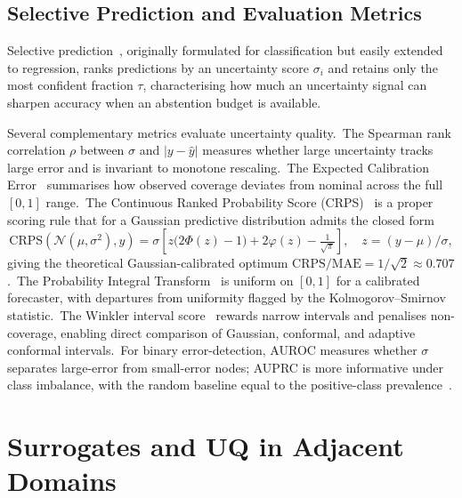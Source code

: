 \subsection{Selective Prediction and Evaluation Metrics}\label{sec:uq_metrics_bg}

Selective prediction~\cite{geifman2017selective}, originally formulated for classification but easily extended to regression, ranks predictions by an uncertainty score $\sigma_i$ and retains only the most confident fraction $\tau$, characterising how much an uncertainty signal can sharpen accuracy when an abstention budget is available.

Several complementary metrics evaluate uncertainty quality.\ The Spearman rank correlation $\rho$ between $\sigma$ and $|y - \hat y|$ measures whether large uncertainty tracks large error and is invariant to monotone rescaling.\ The Expected Calibration Error~\cite{kuleshov2018accurate,guo2017calibration} summarises how observed coverage deviates from nominal across the full $[0,1]$ range.\ The Continuous Ranked Probability Score (CRPS)~\cite{gneiting2007strictly} is a proper scoring rule that for a Gaussian predictive distribution admits the closed form
\begin{equation}\label{eq:crps_gaussian_bg}
 \mathrm{CRPS}\!\left(\mathcal{N}(\mu,\sigma^2), y\right)
 = \sigma\!\left[z\bigl(2\Phi(z) - 1\bigr) + 2\varphi(z) - \tfrac{1}{\sqrt{\pi}}\right],
 \quad z = (y - \mu)/\sigma,
\end{equation}
giving the theoretical Gaussian-calibrated optimum $\mathrm{CRPS}/\mathrm{MAE} = 1/\sqrt{2} \approx 0.707$.\ The Probability Integral Transform~\cite{dawid1984present} is uniform on $[0,1]$ for a calibrated forecaster, with departures from uniformity flagged by the Kolmogorov--Smirnov statistic.\ The Winkler interval score~\cite{winkler1972decision} rewards narrow intervals and penalises non-coverage, enabling direct comparison of Gaussian, conformal, and adaptive conformal intervals.\ For binary error-detection, AUROC measures whether $\sigma$ separates large-error from small-error nodes; AUPRC is more informative under class imbalance, with the random baseline equal to the positive-class prevalence~\cite{davis2006relationship,saito2015precision}.

\section{Surrogates and UQ in Adjacent Domains}\label{sec:related}

